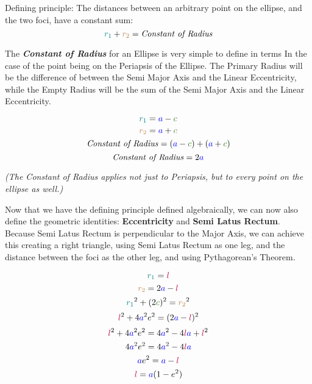 Defining principle:  The distances between an arbitrary point on the ellipse, and the two foci, have a constant sum:
$$\textcolor{teal}{r_1} + \textcolor{brown}{r_2} = \text{{\textit{Constant of Radius}}}$$

The \textbf{\textit{Constant of Radius}} for an Ellipse is very simple to define in terms In the case of the point being on the Periapsis of the Ellipse. The Primary Radius will be the difference of between the Semi Major Axis and the Linear Eccentricity, while the Empty Radius will be the sum of the Semi Major Axis and the Linear Eccentricity.

\bigskip
\begin{minipage}{\textwidth}
$$\textcolor{teal}{r_1} =  \textcolor{blue}{a}-\textcolor{OliveGreen}{c}$$
$$\textcolor{brown}{r_2} =  \textcolor{blue}{a}+\textcolor{OliveGreen}{c}$$
$$\text{\textit{Constant of Radius}}= (\textcolor{blue}{a}-\textcolor{OliveGreen}{c}) + (\textcolor{blue}{a}+\textcolor{OliveGreen}{c})$$
$$\text{{\textit{Constant of Radius}}}=2\textcolor{blue}{a}$$
\begin{center}
\scriptsize{\textit{(The Constant of Radius applies not just to Periapsis, but to every point on the ellipse as well.)}}
\normalsize
\end{center}
\end{minipage}
\bigskip

Now that we have the defining principle defined algebraically, we can now also define the geometric identities: \textbf{Eccentricity} and \textbf{Semi Latus Rectum}. Because Semi Latus Rectum is perpendicular to the Major Axis, we can achieve this creating a right triangle, using Semi Latus Rectum as one leg, and the distance between the foci as the other leg, and using Pythagorean's Theorem.


$$\textcolor{teal}{r_1} = \textcolor{purple}{l}$$
$$\textcolor{brown}{r_2} = 2\textcolor{blue}{a} - \textcolor{purple}{l}$$
$$\textcolor{teal}{r_1}^2 + (2\textcolor{OliveGreen}{c})^2 = \textcolor{brown}{r_2}^2$$
$$\textcolor{purple}{l}^2 + 4\textcolor{blue}{a}^2\textcolor{black}{e}^2 = (2\textcolor{blue}{a} - \textcolor{purple}{l})^2$$
$$\textcolor{purple}{l}^2 + 4\textcolor{blue}{a}^2\textcolor{black}{e}^2 = 4\textcolor{blue}{a}^2-4\textcolor{purple}{l}\textcolor{blue}{a}+\textcolor{purple}{l}^2$$
$$4\textcolor{blue}{a}^2\textcolor{black}{e}^2 = 4\textcolor{blue}{a}^2-4\textcolor{purple}{l}\textcolor{blue}{a}$$
$$\textcolor{blue}{a}\textcolor{black}{e}^2 = \textcolor{blue}{a} - \textcolor{purple}{l}$$
$$\textcolor{purple}{l} = \textcolor{blue}{a}(1-\textcolor{black}{e}^2)$$


